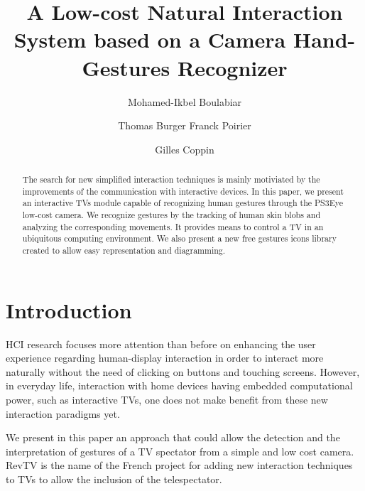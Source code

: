 \documentclass{llncs}
\begin{document}
\frontmatter          %
\pagestyle{headings}  %
\mainmatter              %
%
\title{A Low-cost Natural Interaction System based on a Camera Hand-Gestures Recognizer}
\author{Mohamed-Ikbel Boulabiar \and Thomas Burger
Franck Poirier \and Gilles Coppin}
%

\maketitle

\begin{abstract}
The search for new simplified interaction techniques is 
mainly motiviated by the improvements of 
the communication with interactive devices.
In this paper, we present an interactive TVs module capable
of recognizing human gestures through the PS3Eye low-cost camera.
We recognize gestures by the tracking of human skin blobs and analyzing the 
corresponding movements. It provides means to control a TV in an ubiquitous computing environment.
We also present a new free gestures icons library created to allow easy
representation and diagramming.

\end{abstract}
%

\section{Introduction}
HCI research focuses more attention than before on enhancing the user
experience regarding human-display interaction in order to interact
more naturally without the need of clicking on buttons and touching screens.
However, in everyday life, interaction with home devices having
embedded computational power, such as interactive TVs,
one does not make benefit from these new interaction paradigms yet. 

We present in this paper an approach that could allow the detection and the
interpretation of gestures of a TV spectator from a simple and low cost camera. 
RevTV is the name of the French project for adding new interaction techniques
to TVs to allow the inclusion of the telespectator.
\end{document}
